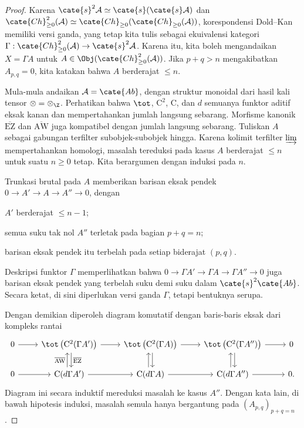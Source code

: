\begin{proof}
	Karena $\cate{s}^2\mathcal{A}\simeq\cate{s}(\cate{s}\mathcal{A})$ dan
	$\cate{Ch}^2_{\geq0}(\mathcal{A})\simeq
	\cate{Ch}_{\geq0}(\cate{Ch}_{\geq0}(\mathcal{A}))$, korespondensi
	Dold--Kan memiliki versi ganda, yang tetap kita tulis sebagai ekuivalensi
	kategori
	$\Gamma:\cate{Ch}^2_{\geq0}(\mathcal{A})\to\cate{s}^2\mathcal{A}$.
	Karena itu, kita boleh mengandaikan $X=\Gamma A$ untuk
	$A\in\Obj(\cate{Ch}^2_{\geq0}(\mathcal{A}))$. Jika
	$p+q>n$ mengakibatkan $A_{p,q}=0$, kita katakan bahwa $A$ berderajat
	$\leq n$.

	Mula-mula andaikan $\mathcal{A}=\cate{Ab}$, dengan struktur monoidal
	dari hasil kali tensor $\otimes=\otimes_{\Z}$. Perhatikan bahwa
	$\tot$, $\mathrm{C}^2$, $\mathrm{C}$, dan $d$ semuanya funktor aditif
	eksak kanan dan mempertahankan jumlah langsung sebarang. Morfisme
	kanonik $\overline{\mathrm{EZ}}$ dan $\overline{\mathrm{AW}}$ juga
	kompatibel dengan jumlah langsung sebarang. Tuliskan $A$ sebagai
	gabungan terfilter subobjek-subobjek hingga. Karena kolimit
	terfilter $\varinjlim$ mempertahankan homologi, masalah tereduksi pada
	kasus $A$ berderajat $\leq n$ untuk suatu $n\geq0$ tetap. Kita
	berargumen dengan induksi pada $n$.

	Trunkasi brutal pada $A$ memberikan barisan eksak pendek
	$0\to A'\to A\to A''\to0$, dengan
	\begin{compactitem}
		\item $A'$ berderajat $\leq n-1$;
		\item semua suku tak nol $A''$ terletak pada bagian $p+q=n$;
		\item barisan eksak pendek itu terbelah pada setiap biderajat $(p,q)$.
	\end{compactitem}
	Deskripsi funktor $\Gamma$ memperlihatkan bahwa
	$0\to\Gamma A'\to\Gamma A\to\Gamma A''\to0$ juga barisan eksak pendek
	yang terbelah suku demi suku dalam $\cate{s}^2\cate{Ab}$. Secara ketat,
	di sini diperlukan versi ganda $\Gamma$, tetapi bentuknya serupa.

	Dengan demikian diperoleh diagram komutatif dengan baris-baris eksak
	dari kompleks rantai
	\[\begin{tikzcd}
		0 \arrow[r] & \tot\left( \mathrm{C}^2(\Gamma A') \right) \arrow[shift left, d, "\overline{\mathrm{EZ}}"] \arrow[r] & \tot\left( \mathrm{C}^2(\Gamma A) \right) \arrow[shift left, d] \arrow[r] & \tot\left( \mathrm{C}^2(\Gamma A'') \right) \arrow[shift left, d] \arrow[r] & 0 \\
		0 \arrow[r] & \mathrm{C}(d\Gamma A') \arrow[shift left, u, "\overline{\mathrm{AW}}"] \arrow[r] & \mathrm{C}(d\Gamma A) \arrow[shift left, u] \arrow[r] & \mathrm{C}(d\Gamma A'') \arrow[shift left, u] \arrow[r] & 0.
	\end{tikzcd}\]
	Diagram ini secara induktif mereduksi masalah ke kasus $A''$. Dengan
	kata lain, di bawah hipotesis induksi, masalah semula hanya bergantung
	pada $(A_{p,q})_{p+q=n}$.


\end{proof}
